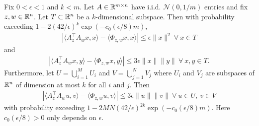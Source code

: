 \documentclass{article}
\begin{document}
\begin{prop} Fix $0 < \epsilon < 1$ and $k < m$. Let $A \in \mathbb{R}^{m \times n}$ have i.i.d. $\mathcal{N}(0,1/m)$ entries and fix $z,w \in \mathbb{R}^n$. Let $T \subset \mathbb{R}^n$ be a $k$-dimensional subspace. Then with probability exceeding $1 - 2(42/\epsilon)^k\exp(-c_0(\epsilon/8)m)$, \begin{align}
|\langle A_z^\top A_w x, x \rangle - \langle \Phi_{z,w} x, x \rangle| \leq \epsilon \|x\|^2\ \forall\ x \in T \label{RCP_bound}
\end{align} and \begin{align}
|\langle A_z^\top A_w x, y \rangle - \langle \Phi_{z,w} x, y \rangle| \leq 3\epsilon \|x\|\|y\|\ \forall\ x,y \in T. \label{RCP_3bound}
\end{align} Furthermore, let $U = \bigcup_{i=1}^M U_i$ and $V = \bigcup_{j=1}^N V_j$ where $U_i$ and $V_j$ are subspaces of $\mathbb{R}^n$ of dimension at most $k$ for all $i$ and $j$. Then
\begin{align}
\left|\langle  A_{z}^\top A_w u, v \rangle - \langle \Phi_{z,w} u,v\rangle\right| \leq 3\epsilon \|u\|\|v\|\ \forall\ u \in U,\ v \in V \label{RCP_union_bound}
\end{align} with probability exceeding $1 - 2MN(42/\epsilon)^{2k}\exp(-c_0(\epsilon/8)m)$. Here $c_0(\epsilon/8) > 0$ only depends on $\epsilon$.

\end{prop}
\end{document}
